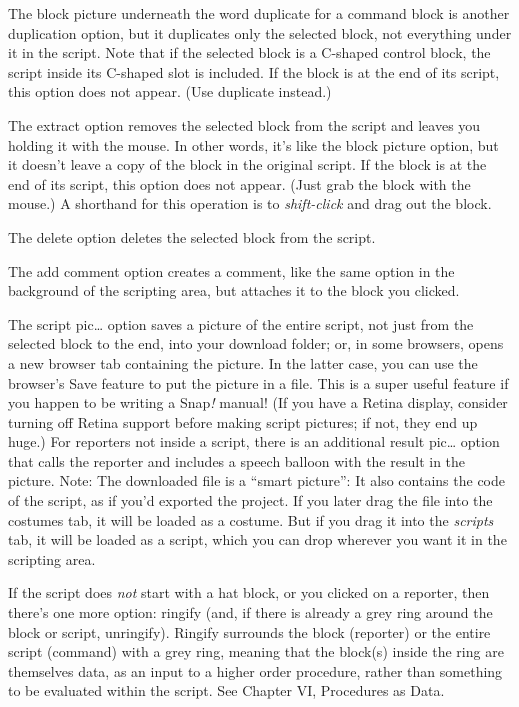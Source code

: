 The block picture underneath the word duplicate for a command block is
another duplication option, but it duplicates only the selected block,
not everything under it in the script. Note that if the selected block
is a C-shaped control block, the script inside its C-shaped slot is
included. If the block is at the end of its script, this option does not
appear. (Use duplicate instead.)

The extract option removes the selected block from the script and leaves
you holding it with the mouse. In other words, it's like the block
picture option, but it doesn't leave a copy of the block in the original
script. If the block is at the end of its script, this option does not
appear. (Just grab the block with the mouse.) A shorthand for this
operation is to \emph{shift-click} and drag out the block.

The delete option deletes the selected block from the script.

The add comment option creates a comment, like the same option in the
background of the scripting area, but attaches it to the block you
clicked.

The script pic\ldots{} option saves a picture of the entire script, not
just from the selected block to the end, into your download folder; or,
in some browsers, opens a new browser tab containing the picture. In the
latter case, you can use the browser's Save feature to put the picture
in a file. This is a super useful feature if you happen to be writing a
Snap\emph{!} manual! (If you have a Retina display, consider turning off
Retina support before making script pictures; if not, they end up huge.)
For reporters not inside a script, there is an additional result
pic\ldots{} option that calls the reporter and includes a speech balloon
with the result in the picture. Note: The downloaded file is a ``smart
picture'': It also contains the code of the script, as if you'd exported
the project. If you later drag the file into the costumes tab, it will
be loaded as a costume. But if you drag it into the \emph{scripts} tab,
it will be loaded as a script, which you can drop wherever you want it
in the scripting area.

If the script does \emph{not} start with a hat block, or you clicked on
a reporter, then there's one more option: ringify (and, if there is
already a grey ring around the block or script, unringify). Ringify
surrounds the block (reporter) or the entire script (command) with a
grey ring, meaning that the block(s) inside the ring are themselves
data, as an input to a higher order procedure, rather than something to
be evaluated within the script. See Chapter VI, Procedures as Data.

